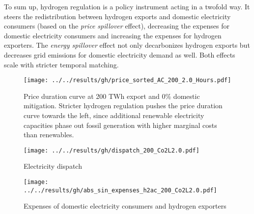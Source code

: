 To sum up, hydrogen regulation is a policy instrument acting in a twofold way. It steers the redistribution between hydrogen exports and domestic electricity consumers (based on the \textit{price spillover} effect), decreasing the expenses for domestic electricity consumers and increasing the expenses for hydrogen exporters. The \textit{energy spillover} effect not only decarbonizes hydrogen exports but decreases grid emissions for  domestic electricity demand as well. Both effects scale with stricter temporal matching.


\begin{figure}[h!]
    \centering
    \texttt{[image: ../../results/gh/price\_sorted\_AC\_200\_2.0\_Hours.pdf]}
    \caption{Price duration curve at 200 TWh export and 0\% domestic mitigation. Stricter hydrogen regulation pushes the price duration curve towards the left, since additional renewable electricity capacities phase out fossil generation with higher marginal costs than renewables.}
    \label{fig:pdc-200-0}
\end{figure}



\begin{figure*}[h!]
    \centering
    \begin{subfigure}[b]{0.49\linewidth}
        \centering
        \texttt{[image: ../../results/gh/dispatch\_200\_Co2L2.0.pdf]}
        \caption{Electricity dispatch}
        \label{fig:dispatch_rule}
    \end{subfigure}
    \hfill
    \begin{subfigure}[b]{0.49\linewidth}
        \centering
        \texttt{[image: ../../results/gh/abs\_sin\_expenses\_h2ac\_200\_Co2L2.0.pdf]}
        \caption{Expenses of domestic electricity consumers and hydrogen exporters}
        \label{fig:expense_h2ac}
    \end{subfigure}
    \hfill
    \caption{Electricity dispatch (\ref{fig:dispatch_rule}) and expenses of consumers (\ref{fig:expense_h2ac}) for various (hydrogen) temporal matching regimes in the 200 TWh export and 0\% mitigation scenario. Stricter temporal matching decreases carbon-intensive electricity generation (coal \& gas) for hydrogen generation and even domestic electricity consumers (s. Fig. \ref{fig:dispatch_rule}). Expenses for export hydrogen generation increase to fulfill the temporal matching constraint, whereas domestic electricity consumers profit from stricter hydrogen regulation.}
    \label{fig:expenses_rule}
\end{figure*}


